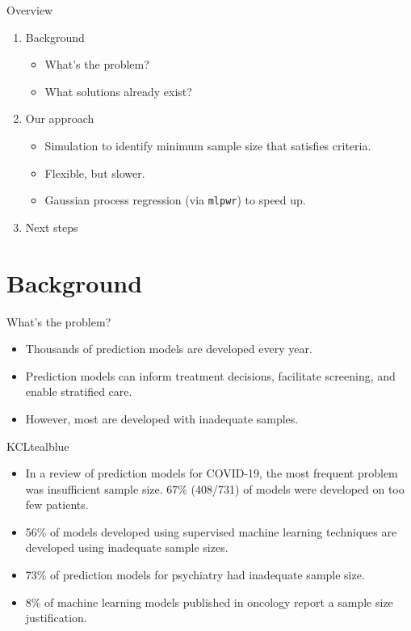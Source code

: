\documentclass[11pt]{beamer}
\begin{document}
\begin{frame}[t]{Overview}
    \begin{enumerate}
        \item Background
            \begin{itemize}
                \item What's the problem?
                \item What solutions already exist?
            \end{itemize}
        \item Our approach
            \begin{itemize}
                \item Simulation to identify minimum sample size that satisfies criteria.
                \item Flexible, but slower.
                \item Gaussian process regression (via \texttt{mlpwr}) to speed up.
            \end{itemize}
        \item Next steps
    \end{enumerate}
\end{frame}

\section{Background}

\begin{frame}[t]{What's the problem?}

    \begin{itemize}
        \item Thousands of prediction models are developed every year.
        \item Prediction models can inform treatment decisions, facilitate
            screening, and enable stratified care.
        \item  However, most are developed with inadequate samples.
    \end{itemize}

    \begin{cbox}{KCLtealblue}{}
        \begin{itemize}
            \item In a review of prediction models for COVID-19, the most
                frequent problem was insufficient sample size. 67\%
                (408/731) of models were developed on too few
                patients\autocite{wynants2020}.
            \item 56\% of models developed using supervised machine learning
                techniques are developed using inadequate sample
                sizes\autocite{navarro2021}.
            \item 73\% of prediction models for psychiatry had inadequate
                sample size\autocite{meehan2022}.
            \item 8\% of machine learning models published in oncology report a
                sample size justification\autocite{dhiman2022}.
        \end{itemize}
    \end{cbox}
\end{frame}
\end{document}
